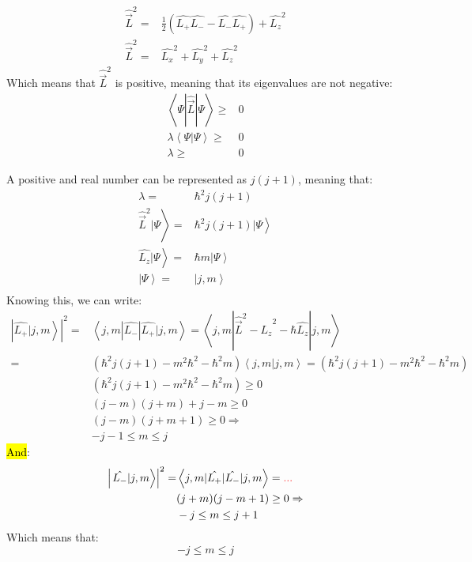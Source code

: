 		\begin{align}
			\hat{\vec{L}}^2 =& \frac{1}{2}\left(\hat{L_+}\hat{L_-} - \hat{L_-}\hat{L_+}\right) + \hat{L_z}^2 \\
			\hat\vec{{L}}^2 =& \hat{L_x}^2 + \hat{L_y}^2 + \hat{L_z}^2
		\end{align}
		Which means that $\hat{\vec{L}}^2$ is positive, meaning that its eigenvalues are not negative:
		\begin{align}
			\left\langle \Psi | \hat{\vec{L}} | \Psi \right\rangle \geq& 0 \\
			\lambda\left\langle \Psi | \Psi \right\rangle \geq& 0 \\
			\lambda \geq& 0 
		\end{align}
		
		A positive and real number can be represented as $j(j + 1)$, meaning that:
		\begin{align}
			\lambda =& \hbar^2 j(j+1) \\
			\left. \hat{\vec{L}}^2 | \Psi \right\rangle =& \left. \hbar^2 j(j+1)| \Psi \right\rangle \\
			\left. \hat{L_z} | \Psi \right\rangle =& \left. \hbar m | \Psi \right\rangle \\
			\left. |\Psi \right\rangle =& \left. |j,m \right\rangle \\ 
		\end{align}
		Knowing this, we can write:
		\begin{align}
			\left|\left. \hat{L_+}|j,m\right\rangle\right|^2 =& \left\langle j,m |\hat{L_-}|\hat{L_+}| j,m \right\rangle = \left\langle j,m |\hat{\vec{L}}^2 - \hat{L_z}^2 - \hbar\hat{L_z}| j,m \right\rangle \\
			=& \left(\hbar^2j(j+1) - m^2\hbar^2 - \hbar^2m\right)\left\langle j,m | j,m \right\rangle = \left(\hbar^2j(j+1) - m^2\hbar^2 - \hbar^2m\right) \\
			& \left(\hbar^2j(j+1) - m^2\hbar^2 - \hbar^2m\right) \geq 0 \\
			& (j - m)(j + m) + j-m \geq 0 \\
			& (j - m)(j + m + 1) \geq 0 \Rightarrow\\
			& -j-1 \leq m \leq j
		\end{align}
		\hl{And}:
		\begin{align}
			\left|\left. \hat{L_-}|j,m\right\rangle\right|^2 =& \left\langle j,m |\hat{L_+}|\hat{L_-}| j,m \right\rangle = \textcolor{red}{...} \\
			& (j + m)(j - m + 1) \geq 0 \Rightarrow\\
			& -j \leq m \leq j + 1
		\end{align}		
		Which means that:
		\begin{equation}
			- j \leq m \leq j		
		\end{equation}
		
